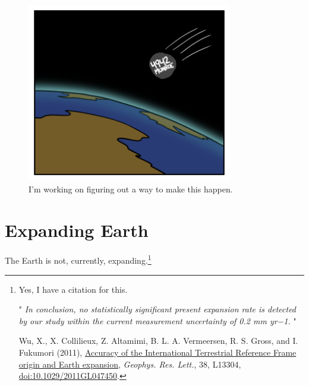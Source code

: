 {\begin{figure}[!htbp]
\centering
\includegraphics[scale=0.5, max width=0.8\textwidth]{imgs/a/66/wind_asteroid.png}
\caption{I'm working on figuring out a way to make this happen.}
\end{figure}

{
\chapter{Expanding Earth}
}

\hfill{}

{The Earth is not, currently, expanding.{\footnote{Yes, I have a citation for this.

" \emph{In conclusion, no statistically significant present expansion rate is detected by our study within the current measurement uncertainty of 0.2 mm yr−1.} "

Wu, X., X. Collilieux, Z. Altamimi, B. L. A. Vermeersen, R. S. Gross, and I. Fukumori (2011), \href{http://repository.tudelft.nl/view/ir/uuid\%3A72ed93c0-d13e-427c-8c5f-f013b737750e/}{Accuracy of the International Terrestrial Reference Frame origin and Earth expansion}, \emph{Geophys. Res. Lett.}, 38, L13304, \href{doi:10.1029/2011GL047450} {doi:10.1029/2011GL047450}.} } }

}

